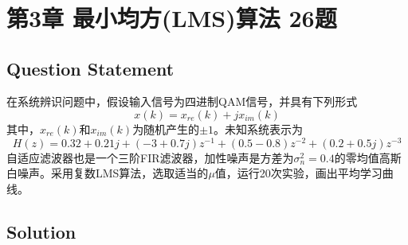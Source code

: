 \documentclass[UTF-8, a4paper, 12pt]{ctexart}
\title{\bfseries \Huge  }
\author{}
\date{}
\begin{document}




     

     
\tableofcontents\thispagestyle{empty}
\newpage
\setcounter{page}{1}        %



\section{第3章 最小均方(LMS)算法 26题}
\subsection{Question Statement}

在系统辨识问题中，假设输入信号为四进制QAM信号，并具有下列形式
\begin{equation}
    x(k)=x_{re}(k)+jx_{im}(k)
\end{equation}
其中，$x_{re}(k)$和$x_{im}(k)$为随机产生的$\pm 1$。未知系统表示为
\begin{equation}
    H(z)=0.32+0.21j+(-3+0.7j)z^{-1}+(0.5-0.8)z^{-2}+(0.2+0.5j)z^{-3}
\end{equation}
自适应滤波器也是一个三阶FIR滤波器，加性噪声是方差为$\sigma_n^2=0.4$的零均值高斯白噪声。采用复数LMS算法，选取适当的$\mu$值，运行20次实验，画出平均学习曲线。

\subsection{Solution}
\end{document}
